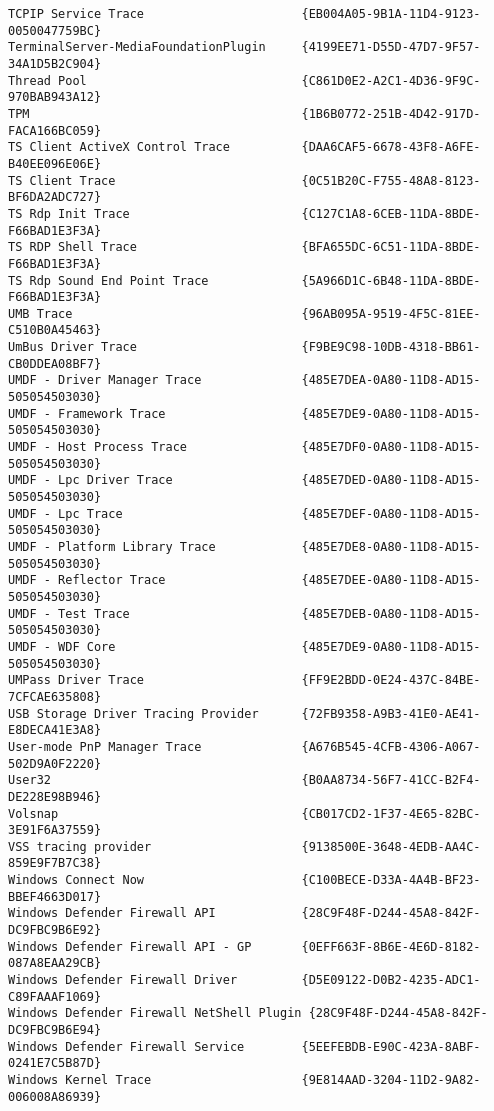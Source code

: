 \documentclass{report}
\begin{document}
\begin{lstlisting}[breaklines=true,basicstyle=\tiny]
TCPIP Service Trace                      {EB004A05-9B1A-11D4-9123-0050047759BC}
TerminalServer-MediaFoundationPlugin     {4199EE71-D55D-47D7-9F57-34A1D5B2C904}
Thread Pool                              {C861D0E2-A2C1-4D36-9F9C-970BAB943A12}
TPM                                      {1B6B0772-251B-4D42-917D-FACA166BC059}
TS Client ActiveX Control Trace          {DAA6CAF5-6678-43F8-A6FE-B40EE096E06E}
TS Client Trace                          {0C51B20C-F755-48A8-8123-BF6DA2ADC727}
TS Rdp Init Trace                        {C127C1A8-6CEB-11DA-8BDE-F66BAD1E3F3A}
TS RDP Shell Trace                       {BFA655DC-6C51-11DA-8BDE-F66BAD1E3F3A}
TS Rdp Sound End Point Trace             {5A966D1C-6B48-11DA-8BDE-F66BAD1E3F3A}
UMB Trace                                {96AB095A-9519-4F5C-81EE-C510B0A45463}
UmBus Driver Trace                       {F9BE9C98-10DB-4318-BB61-CB0DDEA08BF7}
UMDF - Driver Manager Trace              {485E7DEA-0A80-11D8-AD15-505054503030}
UMDF - Framework Trace                   {485E7DE9-0A80-11D8-AD15-505054503030}
UMDF - Host Process Trace                {485E7DF0-0A80-11D8-AD15-505054503030}
UMDF - Lpc Driver Trace                  {485E7DED-0A80-11D8-AD15-505054503030}
UMDF - Lpc Trace                         {485E7DEF-0A80-11D8-AD15-505054503030}
UMDF - Platform Library Trace            {485E7DE8-0A80-11D8-AD15-505054503030}
UMDF - Reflector Trace                   {485E7DEE-0A80-11D8-AD15-505054503030}
UMDF - Test Trace                        {485E7DEB-0A80-11D8-AD15-505054503030}
UMDF - WDF Core                          {485E7DE9-0A80-11D8-AD15-505054503030}
UMPass Driver Trace                      {FF9E2BDD-0E24-437C-84BE-7CFCAE635808}
USB Storage Driver Tracing Provider      {72FB9358-A9B3-41E0-AE41-E8DECA41E3A8}
User-mode PnP Manager Trace              {A676B545-4CFB-4306-A067-502D9A0F2220}
User32                                   {B0AA8734-56F7-41CC-B2F4-DE228E98B946}
Volsnap                                  {CB017CD2-1F37-4E65-82BC-3E91F6A37559}
VSS tracing provider                     {9138500E-3648-4EDB-AA4C-859E9F7B7C38}
Windows Connect Now                      {C100BECE-D33A-4A4B-BF23-BBEF4663D017}
Windows Defender Firewall API            {28C9F48F-D244-45A8-842F-DC9FBC9B6E92}
Windows Defender Firewall API - GP       {0EFF663F-8B6E-4E6D-8182-087A8EAA29CB}
Windows Defender Firewall Driver         {D5E09122-D0B2-4235-ADC1-C89FAAAF1069}
Windows Defender Firewall NetShell Plugin {28C9F48F-D244-45A8-842F-DC9FBC9B6E94}
Windows Defender Firewall Service        {5EEFEBDB-E90C-423A-8ABF-0241E7C5B87D}
Windows Kernel Trace                     {9E814AAD-3204-11D2-9A82-006008A86939}

\end{lstlisting}
\end{document}
